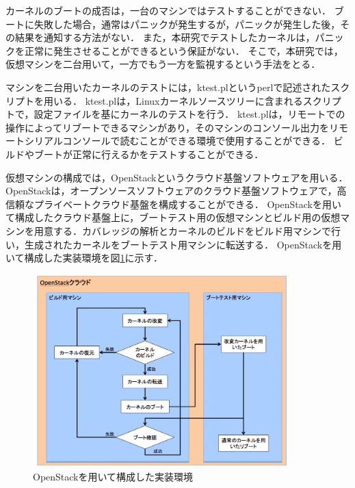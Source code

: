 \documentclass[graduation-thesis]{mlarticle}
\begin{document}
カーネルのブートの成否は，一台のマシンではテストすることができない．
ブートに失敗した場合，通常はパニックが発生するが，パニックが発生した後，その結果を通知する方法がない．
また，本研究でテストしたカーネルは，パニックを正常に発生させることができるという保証がない．
そこで，本研究では，仮想マシンを二台用いて，一方でもう一方を監視するという手法をとる．

マシンを二台用いたカーネルのテストには，ktest.plというperlで記述されたスクリプトを用いる．
ktest.plは，Linuxカーネルソースツリーに含まれるスクリプトで，設定ファイルを基にカーネルのテストを行う．
ktest.plは，リモートでの操作によってリブートできるマシンがあり，そのマシンのコンソール出力をリモートシリアルコンソールで読むことができる環境で使用することができる．
ビルドやブートが正常に行えるかをテストすることができる．

仮想マシンの構成では，OpenStackというクラウド基盤ソフトウェアを用いる．
OpenStackは，オープンソースソフトウェアのクラウド基盤ソフトウェアで，高信頼なプライベートクラウド基盤を構成することができる．
OpenStackを用いて構成したクラウド基盤上に，ブートテスト用の仮想マシンとビルド用の仮想マシンを用意する．カバレッジの解析とカーネルのビルドをビルド用マシンで行い，生成されたカーネルをブートテスト用マシンに転送する．
OpenStackを用いて構成した実装環境を図\ref{fig:openstackenv}に示す．

\begin{figure}[H]
  \begin{center}
    \includegraphics[width=10.0cm]{images/openstackenv.png}
    \caption{OpenStackを用いて構成した実装環境}
    \label{fig:openstackenv}
  \end{center}
\end{figure}
\end{document}
